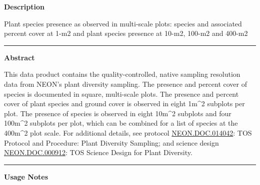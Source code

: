 \documentclass[]{article}
\begin{document}
\textbf{Description}

Plant species presence as observed in multi-scale plots: species and
associated percent cover at 1-m2 and plant species presence at 10-m2,
100-m2 and 400-m2

\begin{center}\rule{0.5\linewidth}{\linethickness}\end{center}

\textbf{Abstract}

This data product contains the quality-controlled, native sampling
resolution data from NEON's plant diversity sampling. The presence and
percent cover of species is documented in square, multi-scale plots. The
presence and percent cover of plant species and ground cover is observed
in eight 1m\^{}2 subplots per plot. The presence of species is observed
in eight 10m\^{}2 subplots and four 100m\^{}2 subplots per plot, which
can be combined for a list of species at the 400m\^{}2 plot scale. For
additional details, see protocol
\href{http://data.neonscience.org/api/v0/documents/NEON.DOC.014042vG}{NEON.DOC.014042}:
TOS Protocol and Procedure: Plant Diversity Sampling; and science design
\href{http://data.neonscience.org/api/v0/documents/NEON.DOC.000912vA}{NEON.DOC.000912}:
TOS Science Design for Plant Diversity.

\begin{center}\rule{0.5\linewidth}{\linethickness}\end{center}

\textbf{Usage Notes}
\end{document}
